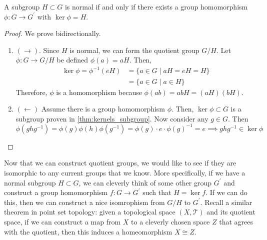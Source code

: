   \begin{lemma}
    \label{thm:normal_kernel}
    A subgroup $H \subset G$ is normal if and only if there exists a group homomorphism $\phi: G \rightarrow G^\prime$ with $\ker{\phi} = H$. 
  \end{lemma}
  \begin{proof}
    We prove bidirectionally. 
    \begin{enumerate}
      \item $(\rightarrow)$. Since $H$ is normal, we can form the quotient group $G/H$. Let $\phi: G \rightarrow G/H$ be defined $\phi(a) = aH$. Then, 
      \begin{align}
        \ker{\phi} = \phi^{-1}(eH) & = \{a \in G \mid aH = eH = H \} \\
                                   & = \{a \in G \mid a \in H \}
      \end{align}
      Therefore, $\phi$ is a homomorphism because $\phi(ab) = abH = (aH)(bH)$.   

      \item $(\leftarrow)$ Assume there is a group homomorphism $\phi$. Then, $\ker{\phi} \subset G$ is a subgroup proven in \ref{thm:kernels_subgroup}. Now consider any $g \in G$. Then 
      \begin{equation}
        \phi(g h g^{-1}) = \phi(g) \phi(h) \phi(g^{-1}) = \phi(g) \cdot e \cdot \phi(g)^{-1} = e \implies g h g^{-1} \in \ker{\phi}
      \end{equation}
    \end{enumerate}
  \end{proof}

  Now that we can construct quotient groups, we would like to see if they are isomorphic to any current groups that we know. More specifically, if we have a normal subgroup $H \subset G$, we can cleverly think of some other group $G^\prime$ and construct a group homomorphism $f: G \to G^\prime$ such that $H = \ker{f}$. If we can do this, then we can construct a nice isomrophism from $G/H$ to $G^\prime$. Recall a similar theorem in point set topology: given a topological space $(X, \mathscr{T})$ and its quotient space, if we can construct a map from $X$ to a cleverly chosen space $Z$ that agrees with the quotient, then this induces a homeomorphism $X \cong Z$. 

